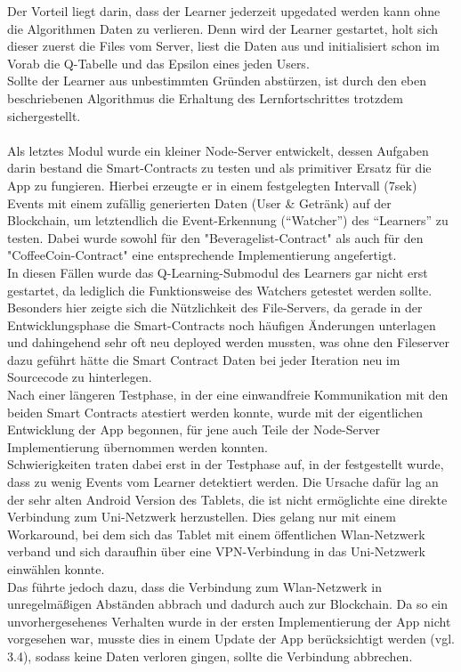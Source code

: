 Der Vorteil liegt darin, dass der Learner jederzeit upgedated werden kann ohne die Algorithmen Daten zu verlieren. Denn wird der Learner gestartet, holt sich dieser zuerst die Files vom Server, liest die Daten aus und initialisiert schon im Vorab die Q-Tabelle und das Epsilon eines jeden Users. \\
Sollte der Learner aus unbestimmten Gründen abstürzen, ist durch den eben beschriebenen Algorithmus die Erhaltung des Lernfortschrittes trotzdem sichergestellt.\\\\
Als letztes Modul wurde ein kleiner Node-Server entwickelt, dessen Aufgaben darin bestand die Smart-Contracts zu testen und als primitiver Ersatz für die App zu fungieren. Hierbei erzeugte er in einem festgelegten Intervall (7sek) Events mit einem zufällig generierten Daten (User \& Getränk) auf der Blockchain, um letztendlich die Event-Erkennung (“Watcher”) des “Learners” zu testen. Dabei wurde sowohl für den "Beveragelist-Contract" als auch für den "CoffeeCoin-Contract" eine entsprechende Implementierung angefertigt.
\\In diesen Fällen wurde das Q-Learning-Submodul des Learners gar nicht erst gestartet, da lediglich die Funktionsweise des Watchers getestet werden sollte.\\
Besonders hier zeigte sich die Nützlichkeit des File-Servers, da gerade in der Entwicklungsphase die Smart-Contracts noch häufigen Änderungen unterlagen und dahingehend sehr oft neu deployed werden mussten, was ohne den Fileserver dazu geführt hätte die Smart Contract Daten bei jeder Iteration neu im Sourcecode zu hinterlegen.\\
Nach einer längeren Testphase, in der eine einwandfreie Kommunikation mit den beiden Smart Contracts atestiert werden konnte, wurde mit der eigentlichen Entwicklung der App begonnen, für jene auch Teile der Node-Server Implementierung übernommen werden konnten.\\
Schwierigkeiten traten dabei erst in der Testphase auf, in der festgestellt wurde, dass zu wenig Events vom Learner detektiert werden. Die Ursache dafür lag an der sehr alten Android Version des Tablets, die ist nicht ermöglichte eine direkte Verbindung zum Uni-Netzwerk herzustellen. Dies gelang nur mit einem Workaround, bei dem sich das Tablet mit einem öffentlichen Wlan-Netzwerk verband und sich daraufhin über eine VPN-Verbindung in das Uni-Netzwerk einwählen konnte. \\
Das führte jedoch dazu, dass die Verbindung zum Wlan-Netzwerk in unregelmäßigen Abständen abbrach und dadurch auch zur Blockchain. Da so ein unvorhergesehenes Verhalten wurde in der ersten Implementierung der App nicht vorgesehen war, musste dies in einem Update der App berücksichtigt werden (vgl. 3.4), sodass keine Daten verloren gingen, sollte die Verbindung abbrechen. \\
